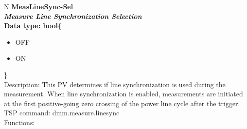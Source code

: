 \documentclass[openany]{article}
\begin{document}
		\begin{tabular}{N}
			\hline
			\bfseries MeasLineSync-Sel\label{pv:measlinesync-sel} \\ \hline
			\emph{Measure Line Synchronization Selection} \\
			Data type: bool\{\begin{itemize}[noitemsep]
				\small
				\item[] OFF
				\item[] ON
			\end{itemize}\} \\
			Description: This PV determines if line synchronization is used during the measurement. When line synchronization is enabled, measurements are initiated at the first positive-going zero crossing of the power line cycle after the trigger. \\
			TSP command: dmm.measure.linesync \\
			Functions: \\
			\arrayrulecolor{\FuncTableBorderColor}

		\end{tabular}
\end{document}
